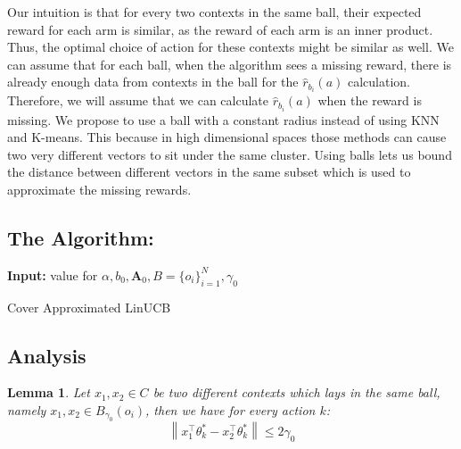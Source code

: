 \documentclass{article}
\newcommand{\norm}[1]{\left\lVert#1\right\rVert}
\newtheorem{lemma}[theorem]{Lemma}
\begin{document}
Our intuition is that for every two contexts in the same ball, their expected reward for each arm is similar, as the reward of each arm is an inner product. Thus, the optimal choice of action for these contexts might be similar as well. We can assume that for each ball, when the algorithm sees a missing reward, there is already enough data from contexts in the ball for the $\hat{r}_{b_i}(a)$ calculation. Therefore, we will assume that we can calculate  $\hat{r}_{b_i}(a)$ when the reward is missing. We propose to use a ball with a constant radius instead of using KNN and K-means. This because in high dimensional spaces those methods can cause two very different vectors to sit under the same cluster. Using balls lets us bound the distance between different vectors in the same subset which is used to approximate the missing rewards.\\

\subsection{The Algorithm:}

\begin{algorithm}[H]
\SetAlgoLined
 \textbf{Input:} value for $\alpha, b_0, \textbf{A}_0, B=\{o_i\}_{i=1}^N, \gamma_0$ \\
    
 \caption{Cover Approximated LinUCB}
\end{algorithm}

\subsection{Analysis}
\begin{lemma}
Let $x_1, x_2 \in C$ be two different contexts which lays in the same ball, namely $x_1, x_2 \in B_{\gamma_0}(o_i)$, then we have for every action $k$:
\begin{equation}
    \norm{x_1^\top \theta^*_k - x_2^\top \theta^*_k} \leq 2\gamma_0
\end{equation}

\end{lemma}
\end{document}
